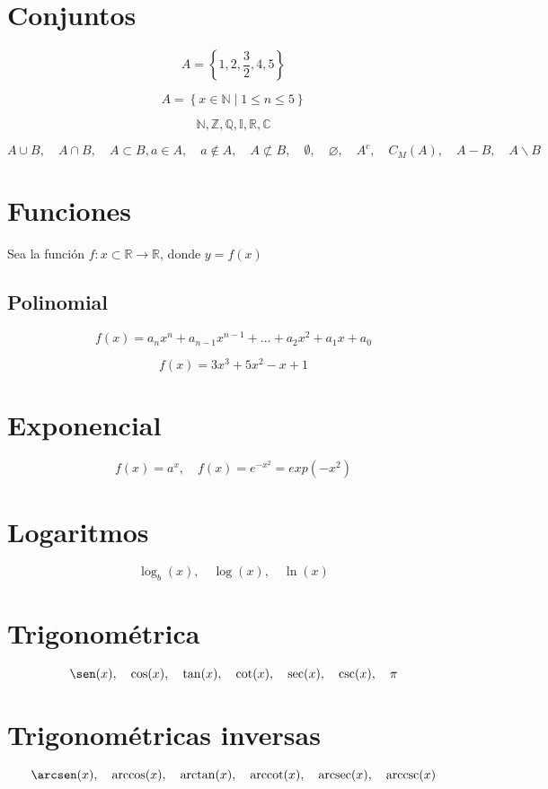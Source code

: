 \documentclass[a4paper, 11pt]{article}
\newcommand{\N}{\mathbb{N}}
\newcommand{\Z}{\mathbb{Z}}
\newcommand{\Q}{\mathbb{Q}}
\newcommand{\I}{\mathbb{I}}
\newcommand{\R}{\mathbb{R}}
\newcommand{\C}{\mathbb{C}}
\newcommand{\arccot}{\text{arccot}}
\newcommand{\arcsec}{\text{arcsec}}
\newcommand{\arccsc}{\text{arccsc}}
\begin{document}
    \section{Conjuntos}
      $$A = \left\{1,2,\frac{3}{2},4,5\right\}$$
    
      $$A = \left\{x \in \mathbb{N}\;|\; 1 \leq n \leq 5\right\}$$
    
      $$\N, \Z, \Q, \I, \R, \C$$
    
      $$A \cup B, \quad A \cap B, \quad A \subset B, a \in A, \quad a \notin A, \quad A \not\subset B,\quad \emptyset, \quad \varnothing, \quad A^c, \quad C_M(A), \quad A-B, \quad A \backslash B $$
      
     \section{Funciones}
       Sea la función $f: x \subset \R \to \R$, donde $y = f(x)$
       \subsection{Polinomial}
       $$f(x) = a_{n} x^{n} + a_{n-1} x^{n-1} + \ldots + a_{2} x^{2} + a_{1} x + a_{0}  $$
       
       $$f(x) = 3x^{3} + 5x^{2} - x + 1 $$
     \section{Exponencial}
       $$f(x) = a^{x}, \quad f(x) = e^{-x^{2}} = exp\left(-x^{2}\right)$$
     
     \section{Logaritmos}
       $$\log_{b}\left(x\right), \quad \log\left(x\right), \quad \ln\left(x\right) $$
     
     \section{Trigonométrica}
       $$\sen(x), \quad \cos(x), \quad \tan(x), \quad \cot(x), \quad \sec(x), \quad \csc(x), \quad \pi$$
     
     \section{Trigonométricas inversas}
      $$\arcsen(x), \quad \arccos(x), \quad \arctan(x), \quad \arccot(x), \quad \arcsec(x), \quad \arccsc(x)$$
     
\end{document}

